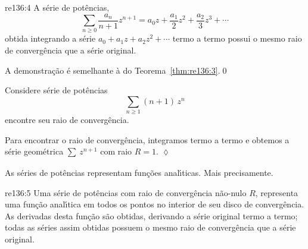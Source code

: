 \begin{theoc}{}{re136:4}
A s\'{e}rie de potências,
\begin{equation*}
\sum_{n\geq 0}\frac{a_n}{n+1}z^{n+1}=a_{0}z+\frac{a_1}{2}z^2+\frac{a_2}{3}z^3+\cdots
\end{equation*}
obtida integrando a s\'{e}rie $a_{0} + a_1z + a_2z^2+\cdots$ termo a
termo possui o mesmo raio de converg\^{e}ncia que a s\'{e}rie original.
\end{theoc}

\begin{prova}
A demonstra\c{c}\~{a}o \'{e} semelhante \`{a} do Teorema~\ref{thm:re136:3}.\qed
\end{prova}

\begin{exer} Considere s\'{e}rie de pot\^{e}ncias
\begin{equation*}
  \sum_{n\geq 1}(n+1)\,z^{n}
\end{equation*}
encontre seu raio de converg\^{e}ncia.
\end{exer}

\begin{solo}
 Para encontrar o raio de converg\^{e}ncia, integramos termo a termo
 e obtemos a s\'{e}rie geom\'{e}trica $\sum_{}\,z^{n+1}$ com raio $R = 1$. \hfill \(\lozenge\)
\end{solo}

As s\'{e}ries de pot\^{e}ncias representam fun\c{c}\~{o}es anal\'{\i}ticas. Mais precisamente.

\begin{theoc}{}{re136:5} 
Uma s\'{e}rie de pot\^{e}ncias com raio de converg\^{e}ncia n\~{a}o-nulo
$R$, representa uma fun\c{c}\~{a}o anal\'{\i}tica em todos os pontos no
interior de seu disco de converg\^{e}ncia. As derivadas desta fun\c{c}\~{a}o
s\~{a}o obtidas, derivando a s\'{e}rie original termo a termo; todas as
s\'{e}ries assim obtidas possuem o mesmo raio de converg\^{e}ncia que a
s\'{e}rie original.
\end{theoc}

